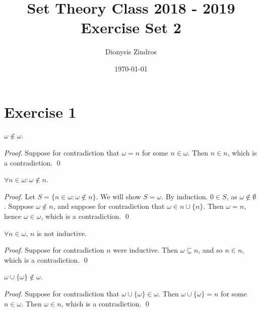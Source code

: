 \documentclass[11pt]{llncs}
\begin{document}
\title{
Set Theory Class 2018 - 2019\\
Exercise Set 2}
\date{\today}
\author{Dionysis Zindros\\
    }
\maketitle
\noindent
\makebox[\linewidth]{\small \today}

\thispagestyle{plain}

\section*{Exercise 1}
\begin{lemma}
  $\omega \not\in \omega$.
\end{lemma}
\begin{proof}
  Suppose for contradiction that $\omega = n$ for some $n \in \omega$. Then
  $n \in n$, which is a contradiction.
  \qed
\end{proof}

\begin{lemma}
  $\forall n \in \omega: \omega \not\in n$.
\end{lemma}
\begin{proof}
  Let $S = \{n \in \omega: \omega \not\in n\}$. We will show $S = \omega$.
  By induction. $0 \in S$, as $\omega \not\in \emptyset$. Suppose
  $\omega \not\in n$, and suppose for contradiction that
  $\omega \in n\cup\{n\}$. Then $\omega = n$, hence $\omega \in \omega$, which
  is a contradiction.
  \qed
\end{proof}

\begin{lemma}
  $\forall n \in \omega$, $n$ is not inductive.
\end{lemma}
\begin{proof}
  Suppose for contradiction $n$ were inductive. Then $\omega \subseteq n$, and
  so $n \in n$, which is a contradiction.
  \qed
\end{proof}

\begin{lemma}
  $\omega \cup \{\omega\} \not\in \omega$.
\end{lemma}
\begin{proof}
  Suppose for contradiction that $\omega \cup \{\omega\} \in \omega$. Then
  $\omega \cup \{\omega\} = n$ for some $n \in \omega$. Then $\omega \in n$,
  which is a contradiction.
  \qed
\end{proof}
\end{document}
